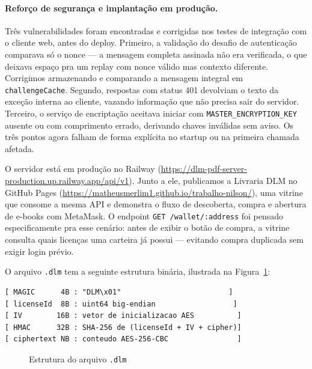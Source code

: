 \documentclass[12pt]{article}
\begin{document}
\paragraph{Reforço de segurança e implantação em produção.}
Três vulnerabilidades foram encontradas e corrigidas nos testes de integração com o cliente web, antes do deploy. Primeiro, a validação do desafio de autenticação comparava só o nonce — a mensagem completa assinada não era verificada, o que deixava espaço pra um replay com nonce válido mas contexto diferente. Corrigimos armazenando e comparando a mensagem integral em \texttt{challengeCache}. Segundo, respostas com status 401 devolviam o texto da exceção interna ao cliente, vazando informação que não precisa sair do servidor. Terceiro, o serviço de encriptação aceitava iniciar com \texttt{MASTER\_ENCRYPTION\_KEY} ausente ou com comprimento errado, derivando chaves inválidas sem aviso. Os três pontos agora falham de forma explícita no startup ou na primeira chamada afetada.

O servidor está em produção no Railway (\url{https://dlm-pdf-server-production.up.railway.app/api/v1}). Junto a ele, publicamos a Livraria DLM no GitHub Pages (\url{https://matheusmerlim1.github.io/trabalho-nilson/}), uma vitrine que consome a mesma API e demonstra o fluxo de descoberta, compra e abertura de e-books com MetaMask. O endpoint \texttt{GET /wallet/:address} foi pensado especificamente pra esse cenário: antes de exibir o botão de compra, a vitrine consulta quais licenças uma carteira já possui — evitando compra duplicada sem exigir login prévio.

O arquivo \texttt{.dlm} tem a seguinte estrutura binária, ilustrada na Figura~\ref{fig:dlm}:

\begin{verbatim}
[ MAGIC      4B : "DLM\x01"                         ]
[ licenseId  8B : uint64 big-endian                  ]
[ IV        16B : vetor de inicializacao AES          ]
[ HMAC      32B : SHA-256 de (licenseId + IV + cipher)]
[ ciphertext NB : conteudo AES-256-CBC                ]
\end{verbatim}

\begin{figure}[H]
\centering
\caption{Estrutura do arquivo \texttt{.dlm}}
\label{fig:dlm}
\end{figure}
\end{document}

